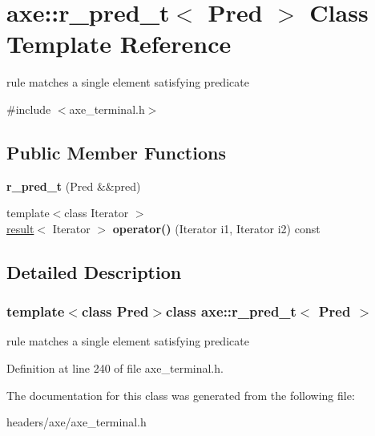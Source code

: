 \hypertarget{classaxe_1_1r__pred__t}{\section{axe\+:\+:r\+\_\+pred\+\_\+t$<$ Pred $>$ Class Template Reference}
\label{classaxe_1_1r__pred__t}
}


rule matches a single element satisfying predicate  




{\ttfamily \#include $<$axe\+\_\+terminal.\+h$>$}

\subsection*{Public Member Functions}
\begin{DoxyCompactItemize}
\item 
\hypertarget{classaxe_1_1r__pred__t_a3bdb7625039034aaf65ae056953fc586}{{\bfseries r\+\_\+pred\+\_\+t} (Pred \&\&pred)}\label{classaxe_1_1r__pred__t_a3bdb7625039034aaf65ae056953fc586}

\item 
\hypertarget{classaxe_1_1r__pred__t_a636c25e4e9a4fd1c7ef34322782a185f}{{\footnotesize template$<$class Iterator $>$ }\\\hyperlink{structaxe_1_1result}{result}$<$ Iterator $>$ {\bfseries operator()} (Iterator i1, Iterator i2) const }\label{classaxe_1_1r__pred__t_a636c25e4e9a4fd1c7ef34322782a185f}

\end{DoxyCompactItemize}


\subsection{Detailed Description}
\subsubsection*{template$<$class Pred$>$class axe\+::r\+\_\+pred\+\_\+t$<$ Pred $>$}

rule matches a single element satisfying predicate 

Definition at line 240 of file axe\+\_\+terminal.\+h.



The documentation for this class was generated from the following file\+:\begin{DoxyCompactItemize}
\item 
headers/axe/axe\+\_\+terminal.\+h\end{DoxyCompactItemize}
